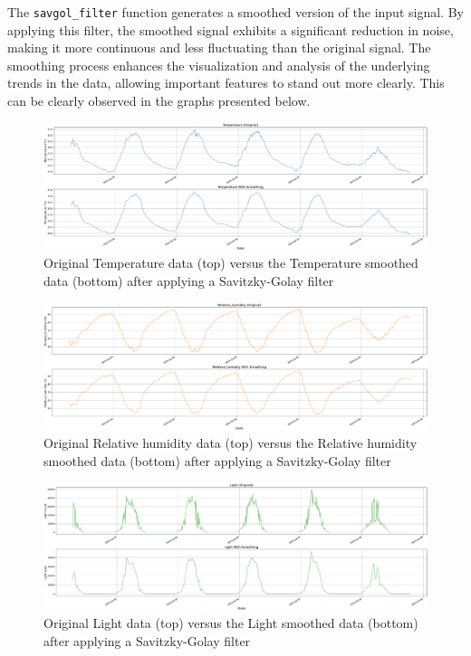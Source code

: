 The \texttt{savgol\_filter} function generates a smoothed version of the input signal. By applying this filter, the smoothed signal exhibits a significant reduction in noise, making it more continuous and less fluctuating than the original signal. The smoothing process enhances the visualization and analysis of the underlying trends in the data, allowing important features to stand out more clearly. This can be clearly observed in the graphs presented below.


\begin{figure}[htbp]
    \centering
    \includegraphics[width=15 cm]{5_ChapterDesign/figuras/2_Smoothing/Smoothing_Temperature}
    \caption{Original Temperature data (top) versus the Temperature smoothed data (bottom) after applying a Savitzky-Golay filter}
\end{figure}

\begin{figure}[htbp]
    \centering
    \includegraphics[width=15 cm]{5_ChapterDesign/figuras/2_Smoothing/Smoothing_Relative_humidity}
    \caption{Original Relative humidity data (top) versus the Relative humidity smoothed data (bottom) after applying a Savitzky-Golay filter}
\end{figure}

\begin{figure}[htbp]
    \centering
    \includegraphics[width=15 cm]{5_ChapterDesign/figuras/2_Smoothing/Smoothing_Light}
    \caption{Original Light data (top) versus the Light smoothed data (bottom) after applying a Savitzky-Golay filter}
\end{figure}

